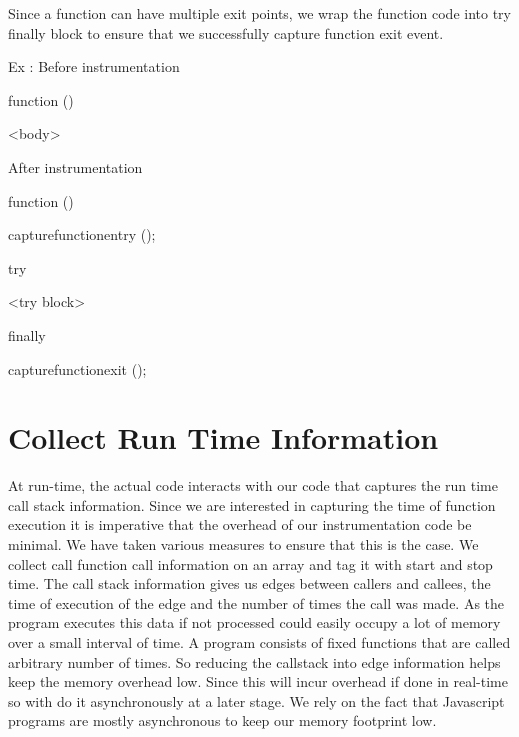 \documentclass[paper=a4, fontsize=11pt]{scrartcl} %
\numberwithin{equation}{section} %
\numberwithin{figure}{section} %
\numberwithin{table}{section} %
\begin{document}
Since a function can have multiple exit points, we wrap the function code into try finally block to ensure that we successfully capture function exit event.

Ex : Before instrumentation
       
        function () 
        
        {
                       
          <body>
        
        }
         
        After instrumentation

        function ()
        
        {
          capturefunctionentry ();
          
        }

        try 
         
        {
        
          <try block>
          
        } 
        
        finally
        
        {
        
          capturefunctionexit ();
          
        }
       

\section{Collect Run Time Information}

At run-time, the actual code interacts with our code that captures the run time call stack information. Since we are interested in capturing the time of function execution it is imperative that the overhead of our instrumentation code be minimal. We have taken various measures to ensure that this is the case. We collect call function call information on an array and tag it with start and stop time. The call stack information gives us edges between callers and callees, the time of execution of the edge and the number of times the call was made. As the program executes this data if not processed could easily occupy a lot of memory over a small interval of time. A program consists of fixed functions that are called arbitrary number of times. So reducing the callstack into edge information helps keep the memory overhead low. Since this will incur overhead if done in real-time so with do it asynchronously at a later stage.  We rely on the fact that Javascript programs are mostly asynchronous to keep our memory footprint low.
\end{document}
